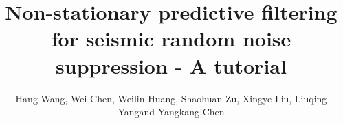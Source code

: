 \title{Non-stationary predictive filtering for seismic random noise suppression - A tutorial}
\renewcommand{\thefootnote}{\fnsymbol{footnote}}
\author{Hang Wang\footnotemark[1], Wei Chen\footnotemark[2], Weilin Huang\footnotemark[3], Shaohuan Zu\footnotemark[4], Xingye Liu\footnotemark[5], Liuqing Yang\footnotemark[3] and Yangkang Chen\footnotemark[1]}

\address{
\footnotemark[1]
School of Earth Sciences\\
Zhejiang University\\
Hangzhou, Zhejiang Province, China, 310027\\
18328504171@163.com \& chenyk2016@gmail.com \\
\footnotemark[2] Key Laboratory of Exploration Technology for Oil and Gas Resources of Ministry of Education\\
Yangtze University\\
Daxue Road No.111\\
Caidian District\\
Wuhan, China, 430100\\
chenwei2014@yangtzeu.edu.cn\& yangliuqingqin@163.com\\
\footnotemark[3] State Key Laboratory of Petroleum Resources and Prospecting \\
China University of Petroleum \\
Fuxue Road 18th\\
Beijing, China, 102200\\
cup\_hwl@126.com \\
\footnotemark[4] College of Geophysics\\
Chengdu University of Technology \\
Dongsanlu, Erxianqiao, Chengdu 610059, Sichuan, China \\
zushaohuan@qq.com\\
\footnotemark[5] College of Geology and Environment\\
Xi’an University of Science and Technology\\
Xi’an, Shaanxi Province, China, 710054 \\
lwxwyh506673@126.com\\
Corresponding author: Yangkang Chen, chenyk2016@gmail.com
}


\DeclareRobustCommand{\dlo}[1]{}
\DeclareRobustCommand{\wen}[1]{#1}

